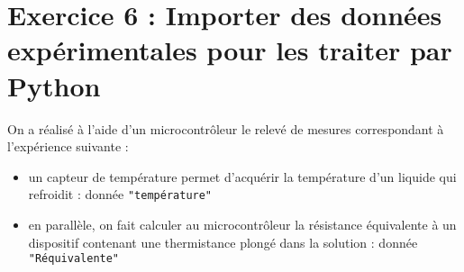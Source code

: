 \documentclass[11pt]{article}
\begin{document}
\begin{comment}
\end{itemize}


\medskip
\item À chacun de choisir son niveau de difficulté ; conseil : 

\begin{itemize}
 \item Par défaut, commencez par le niveau 2, c'est ainsi que l'énoncé est rédigé. 
 
 Si vous vous sentez à l'aise, vous pouvez tenter de réaliser les exercices sans les aides (niveau 1).
 
 Si vous avez des difficultés, passez au niveau 3.
\end{itemize}


\smallskip
\item \textit{Enfin, et même si cela n'est pas précisé, pensez à compiler votre code régulièrement pour vérifier si vous répondez bien aux questions.}

\end{itemize}



\end{comment}






\newpage

\setcounter{section}{5}


\section{Exercice 6 : Importer des données expérimentales pour les traiter par Python}


On a réalisé à l'aide d'un microcontrôleur le relevé de mesures correspondant à l'expérience suivante : 

\begin{itemize}
 \item un capteur de température permet d'acquérir la température d'un liquide qui refroidit : donnée \texttt{"température"}
 \item en parallèle, on fait calculer au microcontrôleur la résistance équivalente à un dispositif contenant une thermistance plongé dans la solution : donnée \texttt{"Réquivalente"}
\end{itemize}
\end{document}
